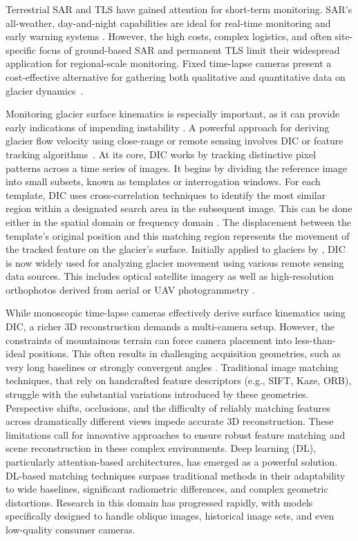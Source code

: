 Terrestrial SAR and TLS have gained attention for short-term monitoring. 
SAR's all-weather, day-and-night capabilities are ideal for real-time monitoring and early warning systems \cite{Noferini2009, Dematteis2021}. 
However, the high costs, complex logistics, and often site-specific focus of ground-based SAR and permanent TLS limit their widespread application for regional-scale monitoring.
Fixed time-lapse cameras present a cost-effective alternative for gathering both qualitative and quantitative data on glacier dynamics~\citep{Giordan2016, James2016, Maas2006, Messerli2015}.

Monitoring glacier surface kinematics is especially important, as it can provide early indications of impending instability \citep{Faillettaz2015}.
A powerful approach for deriving glacier flow velocity using close-range or remote sensing involves DIC or feature tracking algorithms~\citep{ahn_box_2010, Giordan2016, Hadhri2019}.
At its core, DIC works by tracking distinctive pixel patterns across a time series of images.
It begins by dividing the reference image into small subsets, known as templates or interrogation windows. 
For each template, DIC uses cross-correlation techniques to identify the most similar region within a designated search area in the subsequent image.
This can be done either in the spatial domain \citep{Scambos1992} or frequency domain \citep{rolstad1997}.
The displacement between the template’s original position and this matching region represents the movement of the tracked feature on the glacier's surface.
Initially applied to glaciers by \cite{Scambos1992}, DIC is now widely used for analyzing glacier movement using various remote sensing data sources.
This includes optical satellite imagery \citep{Scambos1992, Scherler2008, Heid2012_evaluation_xcorr} as well as high-resolution orthophotos derived from aerial or UAV photogrammetry \citep{immerzeel2014, Chudley2019, ioli2021mid}.

While monoscopic time-lapse cameras effectively derive surface kinematics using DIC, a richer 3D reconstruction demands a multi-camera setup. 
However, the constraints of mountainous terrain can force camera placement into less-than-ideal positions. 
This often results in challenging acquisition geometries, such as very long baselines or strongly convergent angles \citep{ioli2024deep}.
Traditional image matching techniques, that rely on handcrafted feature descriptors (e.g., SIFT, Kaze, ORB), struggle with the substantial variations introduced by these geometries.  Perspective shifts, occlusions, and the difficulty of reliably matching features across dramatically different views impede accurate 3D reconstruction. 
These limitations call for innovative approaches to ensure robust feature matching and scene reconstruction in these complex environments.
Deep learning (DL), particularly attention-based architectures, has emerged as a powerful solution. 
DL-based matching techniques surpass traditional methods in their adaptability to wide baselines, significant radiometric differences, and complex geometric distortions. 
Research in this domain has progressed rapidly, with models specifically designed to handle oblique images, historical image sets, and even low-quality consumer cameras.

